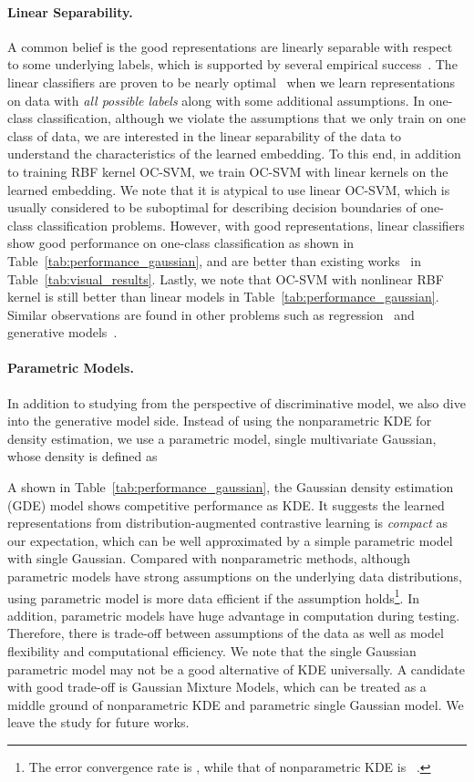 \documentclass{article} \usepackage{iclr2021_conference,times}
\begin{document}
\paragraph{Linear Separability.} 
A common belief is the good representations are linearly separable with respect to some underlying labels, which is supported by several empirical success~\cite{chen2020simple}. The linear classifiers are proven to be nearly optimal~\cite{tosh2020contrastive} when we learn representations on data with \emph{all possible labels} along with some additional assumptions. In one-class classification, although we violate the assumptions that we only train on one class of data, we are interested in the linear separability of the data to understand the characteristics of the learned embedding. 
To this end, in addition to training RBF kernel OC-SVM, we train OC-SVM with linear kernels on the learned embedding.  We note that it is atypical to use linear OC-SVM, which is usually considered to be suboptimal for describing decision boundaries of one-class classification problems. However, with good representations, linear classifiers show good performance on one-class classification as shown in Table~\ref{tab:performance_gaussian}, and are better than existing works~\cite{golan2018deep} in Table~\ref{tab:visual_results}. 
Lastly, we note that OC-SVM with nonlinear RBF kernel is still better than linear models in Table~\ref{tab:performance_gaussian}. Similar observations are found in other problems such as regression~\cite{wilson2016deep} and generative models~\cite{li2017mmd}.


\paragraph{Parametric Models.} 
In addition to studying from the  perspective of discriminative model, we also dive into the generative model side. 
Instead of using the nonparametric KDE for density estimation, we use a parametric model, single multivariate Gaussian, whose density is defined as

A shown in Table~\ref{tab:performance_gaussian}, the Gaussian density estimation (GDE) model shows competitive performance as KDE. 
It suggests the learned representations from distribution-augmented contrastive learning is \emph{compact} as our expectation, which can be well approximated by a simple parametric model with single Gaussian. 
Compared with nonparametric methods, although parametric models have strong assumptions on the underlying data distributions,  using parametric model is more data efficient if the assumption holds\footnote{The error convergence rate is , while that of nonparametric KDE is ~\cite{tsybakov2008introduction}.}.
In addition, parametric models have huge advantage in computation during testing.
Therefore, there is trade-off between assumptions of the data as well as model flexibility and computational efficiency.  
We note that the single Gaussian parametric model may not be a good alternative of KDE universally. A candidate with good trade-off is Gaussian Mixture Models, which can be treated as a middle ground of nonparametric KDE and parametric single Gaussian model. 
We leave the study for future works.  
\end{document}
